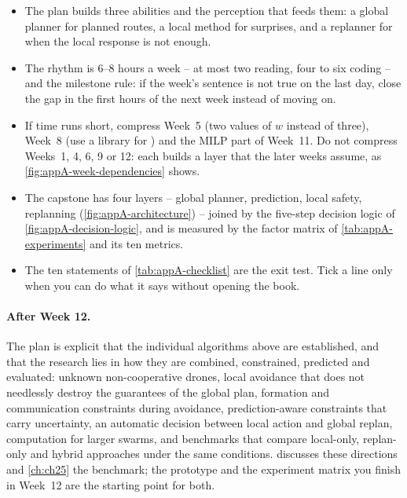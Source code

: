 \begin{summary}
\begin{itemize}
  \item The plan builds three abilities and the perception that feeds them: a global planner
    for planned routes, a local method for surprises, and a replanner for when the local
    response is not enough.
  \item The rhythm is 6--8 hours a week -- at most two reading, four to six coding -- and the
    milestone rule: if the week's sentence is not true on the last day, close the gap in the
    first hours of the next week instead of moving on.
  \item If time runs short, compress Week~5 (two values of $w$ instead of three), Week~8
    (use a library for \rrtstar) and the MILP part of Week~11. Do not compress Weeks~1, 4, 6, 9 or 12: each
    builds a layer that the later weeks assume, as \cref{fig:appA-week-dependencies} shows.
  \item The capstone has four layers -- global planner, prediction, local safety,
    replanning (\cref{fig:appA-architecture}) -- joined by the five-step decision logic of
    \cref{fig:appA-decision-logic}, and is measured by the factor matrix of
    \cref{tab:appA-experiments} and its ten metrics.
  \item The ten statements of \cref{tab:appA-checklist} are the exit test. Tick a line only
    when you can do what it says without opening the book.
\end{itemize}
\end{summary}

\paragraph{After Week 12.}
The plan is explicit that the individual algorithms above are established, and that the
research lies in how they are combined, constrained, predicted and evaluated: unknown
non-cooperative drones, local avoidance that does not needlessly destroy the guarantees of
the global plan, formation and communication constraints during avoidance,
prediction-aware constraints that carry uncertainty, an automatic decision between local
action and global replan, computation for larger swarms, and benchmarks that compare
local-only, replan-only and hybrid approaches under the same conditions. 
discusses these directions and \cref{ch:ch25} the benchmark; the prototype and the
experiment matrix you finish in Week~12 are the starting point for both.
